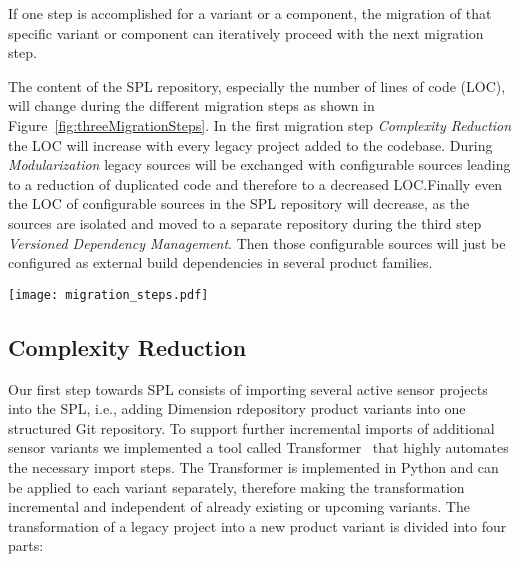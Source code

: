 If one step is accomplished for a variant or a component, the migration of that
specific variant or component can iteratively proceed with the next migration
step.

The content of the SPL repository, especially the number of lines of code (LOC),
will change during the different migration steps as shown in
Figure~\ref{fig:threeMigrationSteps}. In the first migration step
\textit{Complexity Reduction} the LOC will increase with every legacy project
added to the codebase. During \textit{Modularization} legacy sources will be
exchanged with configurable sources leading to a reduction of duplicated code
and therefore to a decreased LOC.\@ Finally even the LOC of configurable sources
in the SPL repository will decrease, as the sources are isolated and moved to a
separate repository during the third step \textit{Versioned Dependency
Management}. Then those configurable sources will just be configured as external
build dependencies in several product families.

\begin{figure*}[ht]
  \centering
  \texttt{[image: migration\_steps.pdf]}
  \caption{Three Migration Steps to SPL}
  \label{fig:threeMigrationSteps}
\end{figure*}

\subsection{Complexity Reduction}\label{complexity}

Our first step towards SPL consists of importing several active sensor projects
into the SPL, i.e., adding Dimension rdepository product variants into one
structured Git repository. To support further incremental imports of additional
sensor variants we implemented a tool called
Transformer~\cite{GithubTransformer} that highly automates the necessary import
steps. The Transformer is implemented in Python and can be applied to each
variant separately, therefore making the transformation incremental and
independent of already existing or upcoming variants. The transformation of a
legacy project into a new product variant is divided into four parts:

